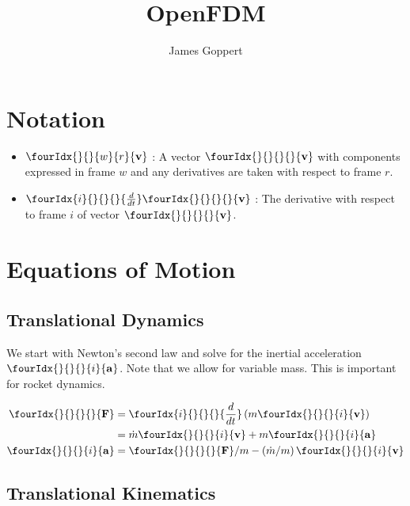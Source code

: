 \documentclass[10pt,letterpaper]{article}
\author{James Goppert}
\title{OpenFDM}
\newcommand{\ddt}[1]{\fourIdx{#1}{}{}{}{\frac{d}{dt}}}
\newcommand{\vect}[3]{\fourIdx{}{}{#3}{#2}{\mathbf{#1}}}
\newcommand{\vi}[0]{\vect{v}{i}{}}
\newcommand{\ai}[0]{\vect{a}{i}{}}
\newcommand{\sumF}[0]{\vect{F}{}{}}
\begin{document}
\maketitle
\newpage

\section*{Notation}
\begin{itemize}
\item $\vect{v}{r}{w}$ : A vector $\vect{v}{}{}$ with components expressed in frame $w$ and any derivatives are taken with respect to frame $r$.
\item $\ddt{i}\vect{v}{}{}$ : The derivative with respect to frame $i$ of vector $\vect{v}{}{}$.
\end{itemize}

\section{Equations of Motion}

\subsection{Translational Dynamics}

We start with Newton's second law and solve for the inertial acceleration $\ai$. Note that we allow for variable mass. This is important for rocket dynamics.

\begin{align}
\sumF &= \ddt{i} \left(m \vi \right) \notag \\
&= \dot{m} \vi + m \ai \notag \\
\ai &= \sumF/m - \left(\dot{m}/m\right) \vi
\label{eq:trans_dyn}
\end{align}

\subsection{Translational Kinematics}
\end{document}
